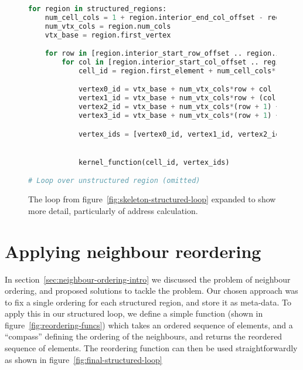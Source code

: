 \begin{figure}
\newsavebox{\structureloopb}
\begin{lrbox}{\structureloopb}
\begin{lstlisting}[language=python]
for region in structured_regions:
	num_cell_cols = 1 + region.interior_end_col_offset - region.interior_end_start_offset
	num_vtx_cols = region.num_cols
	vtx_base = region.first_vertex

	for row in [region.interior_start_row_offset .. region.interior_end_row_offset]:
		for col in [region.interior_start_col_offset .. region.interior_end_col_offset]:
			cell_id = region.first_element + num_cell_cols*row + col

			vertex0_id = vtx_base + num_vtx_cols*row + col
			vertex1_id = vtx_base + num_vtx_cols*row + (col + 1)
			vertex2_id = vtx_base + num_vtx_cols*(row + 1) + col
			vertex3_id = vtx_base + num_vtx_cols*(row + 1) + (col + 1)

			vertex_ids = [vertex0_id, vertex1_id, vertex2_id, vertex3_id]


			kernel_function(cell_id, vertex_ids)

# Loop over unstructured region (omitted)
\end{lstlisting}
\end{lrbox}

\usebox{\structureloopb}
\caption{The loop from figure~\ref{fig:skeleton-structured-loop} expanded to show more detail, particularly of address calculation.}
\label{fig:detailed-structured-loop}
\end{figure}



\section{Applying neighbour reordering}
\label{sec:apply-reordering}
In section~\ref{sec:neighbour-ordering-intro} we discussed the problem of neighbour ordering, and proposed solutions to tackle the problem. Our chosen approach was to fix a single ordering for each structured region, and store it as meta-data. To apply this in our structured loop, we define a simple function (shown in figure~\ref{fig:reordering-funcs}) which takes an ordered sequence of elements, and a ``compass'' defining the ordering of the neighbours, and returns the reordered sequence of elements. The reordering function can then be used straightforwardly as shown in figure~\ref{fig:final-structured-loop}


